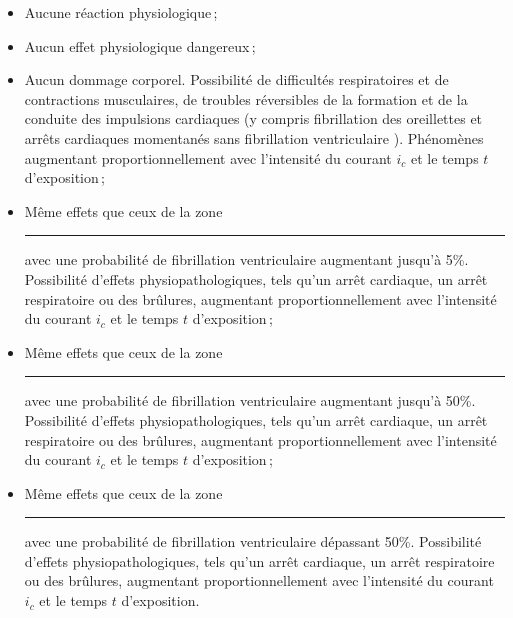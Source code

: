\documentclass[a4paper, 11pt, twoside, fleqn]{memoir}
\begin{document}
\begin{figure}[h]
\begin{center}
\end{center}
\end{figure}

\begin{mdframed}
\begin{itemize}
\item[\textcolor{YellowGreen}{\rule{1.5em}{1.2ex}}] Aucune réaction physiologique\,;
\item[\textcolor{yellow}{\rule{1.5em}{1.2ex}}] Aucun effet physiologique dangereux\,;
\item[\textcolor{yellow!75!red}{\rule{1.5em}{1.2ex}}] Aucun dommage corporel. Possibilité de difficultés respiratoires et de contractions musculaires, de troubles réversibles de la formation et de la conduite des impulsions cardiaques (y compris fibrillation des oreillettes et arrêts cardiaques momentanés sans fibrillation ventriculaire ). Phénomènes augmentant proportionnellement avec l'intensité du courant $i_c$ et le temps $t$ d'exposition\,;
\item[\textcolor{yellow!50!red}{\rule{1.5em}{1.2ex}}] Même effets que ceux de la zone \textcolor{yellow!75!red}{\rule{1.5em}{1.2ex}} avec une probabilité de fibrillation ventriculaire augmentant jusqu'à 5\%. Possibilité d'effets physiopathologiques, tels qu'un arrêt cardiaque, un arrêt respiratoire ou des brûlures, augmentant proportionnellement avec l'intensité du courant $i_c$ et le temps $t$ d'exposition\,;
\item[\textcolor{yellow!25!red}{\rule{1.5em}{1.2ex}}] Même effets que ceux de la zone \textcolor{yellow!75!red}{\rule{1.5em}{1.2ex}} avec une probabilité de fibrillation ventriculaire augmentant jusqu'à 50\%. Possibilité d'effets physiopathologiques, tels qu'un arrêt cardiaque, un arrêt respiratoire ou des brûlures, augmentant proportionnellement avec l'intensité du courant $i_c$ et le temps $t$ d'exposition\,;
\item[\textcolor{red}{\rule{1.5em}{1.2ex}}] Même effets que ceux de la zone \textcolor{yellow!75!red}{\rule{1.5em}{1.2ex}} avec une probabilité de fibrillation ventriculaire dépassant 50\%. Possibilité d'effets physiopathologiques, tels qu'un arrêt cardiaque, un arrêt respiratoire ou des brûlures, augmentant proportionnellement avec l'intensité du courant $i_c$ et le temps $t$ d'exposition.
\end{itemize}
\end{mdframed}
\end{document}
